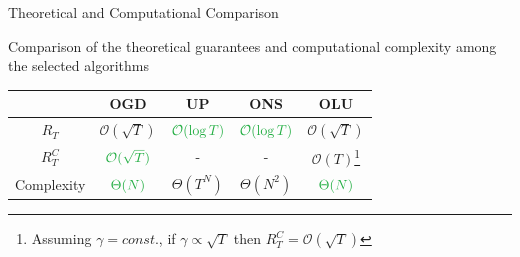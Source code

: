 \documentclass[10pt]{beamer}
\makeatletter
\def\mathcolor#1#{\@mathcolor{#1}}
\def\@mathcolor#1#2#3{%
  \protect\leavevmode
  \begingroup
    \color#1{#2}#3%
  \endgroup
}
\makeatother
\begin{document}




\begin{frame}{Theoretical and Computational Comparison}

Comparison of the theoretical guarantees and computational complexity among the selected algorithms

\begin{table}[ht!]\centering\small
\begin{tabular}{ |c||c|c|c|c| }
 \hline
  & \textbf{OGD} & \textbf{UP} & \textbf{ONS} & \textbf{OLU}\\
 \hline
 \hline
 $R_T$ & $\mathcal O(\sqrt T)$  & $\mathcolor{ultramarine}{\mathcal O(\log T)} $ & $\mathcolor{ultramarine}{\mathcal O(\log T)}$ & $\mathcal O(\sqrt T)$ \\
 \hline
 $R^C_T$ & $\mathcolor{ultramarine}{\mathcal O(\sqrt T)}$ & - & - & $\mathcal O(T)$\footnote{Assuming $\gamma=const.$, if $\gamma\propto\sqrt T$ then $R_T^C=\mathcal O(\sqrt T)$}\\
 \hline
 Complexity & $\mathcolor{ultramarine}{\Theta(N)}$ & $\Theta (T^N)$ & $\Theta (N^2)$  & $\mathcolor{ultramarine}{\Theta (N)}$\\
 \hline
\end{tabular}
\end{table}


\end{frame}

\end{document}
